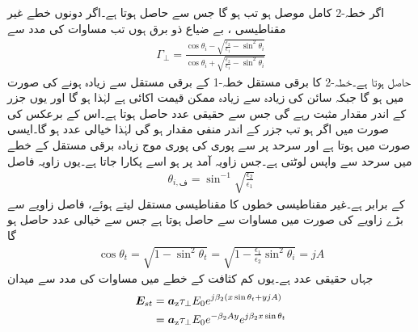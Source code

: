 اگر خطہ-2 کامل موصل ہو تب  ہو گا جس سے  حاصل ہوتا ہے۔اگر دونوں خطے غیر مقناطیسی ، بے ضیاع ذو برق ہوں تب مساوات  کی مدد سے
\begin{align}\label{مساوات_ترچھی_شرح_انعکاس_عمودی_موج}
\Gamma_{\perp}=\frac{\cos \theta_i -\sqrt{\frac{\epsilon_2}{\epsilon_1}-\sin^2 \theta_i}}{\cos \theta_i +\sqrt{\frac{\epsilon_2}{\epsilon_1}-\sin^2 \theta_i}}
\end{align}
حاصل ہوتا ہے۔خطہ-2 کا برقی مستقل خطہ-1 کے برقی مستقل سے زیادہ ہونے کی صورت  میں  ہو گا جبکہ سائن کی زیادہ سے زیادہ ممکن قیمت اکائی ہے  لہٰذا  ہو گا اور یوں جزر کے اندر مقدار مثبت رہے گی جس سے  حقیقی عدد حاصل ہوتا ہے۔اس کے برعکس  کی صورت میں اگر  ہو تب جزر کے اندر منفی مقدار ہو گی لہٰذا  خیالی عدد ہو گا۔ایسی صورت میں  ہوتا ہے اور سرحد پر   سے  پوری کی پوری موج زیادہ برقی مستقل کے خطے میں سرحد سے واپس لوٹتی ہے۔جس زاویہ آمد پر  ہو اسے  پکارا جاتا ہے۔یوں زاویہ فاصل
\begin{align}\label{مساوات_ترچھی_فاصل_زاویہ}
\theta_{i,\text{ف}}= \sin^{-1} \sqrt{\frac{\epsilon_2}{\epsilon_1}}
\end{align}
کے برابر ہے۔غیر مقناطیسی خطوں کا مقناطیسی مستقل  لیتے ہوئے، فاصل زاویے سے بڑے زاویے  کی صورت میں مساوات  سے  حاصل ہوتا ہے جس سے  خیالی عدد حاصل ہو گا
\begin{align}\label{مساوات_ترچھی_خیالی_انحرافی_زاویہ}
\cos \theta_t=\sqrt{1-\sin^2 \theta_t}=\sqrt{1-\frac{\epsilon_1}{\epsilon_2}\sin^2 \theta_i} =jA
\end{align}
جہاں  حقیقی عدد ہے۔یوں کم کثافت کے خطے میں مساوات  کی مدد سے میدان
\begin{align*}
{\ensuremath{{\boldsymbol{E}}}}_{st} &={\boldsymbol{a}}_{\textup{z}} \tau_{\perp} E_0 e^{j \beta_2 (x \sin \theta_t+y jA)} \\
&={\boldsymbol{a}}_{\textup{z}} \tau_{\perp} E_0 e^{-\beta_2 A y}e^{j \beta_2 x \sin \theta_t}
\end{align*}
